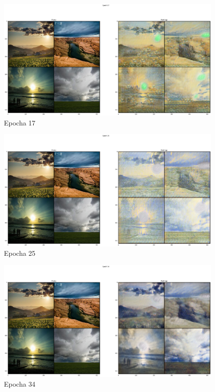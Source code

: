 \documentclass[czech]{mvi-report}
\begin{document}
\begin{figure}[h!]
  \centering\leavevmode
  \includegraphics[width=1\linewidth]{img/epochs/e17}\vskip-0.5cm
  \caption{Epocha 17}
  \label{fig:epoch-17}
\end{figure}

\begin{figure}[h!]
  \centering\leavevmode
  \includegraphics[width=1\linewidth]{img/epochs/e25}\vskip-0.5cm
  \caption{Epocha 25}
  \label{fig:epoch-25}
\end{figure}

\begin{figure}[h!]
  \centering\leavevmode
  \includegraphics[width=1\linewidth]{img/epochs/e34}\vskip-0.5cm
  \caption{Epocha 34}
  \label{fig:epoch-34}
\end{figure}
\end{document}
